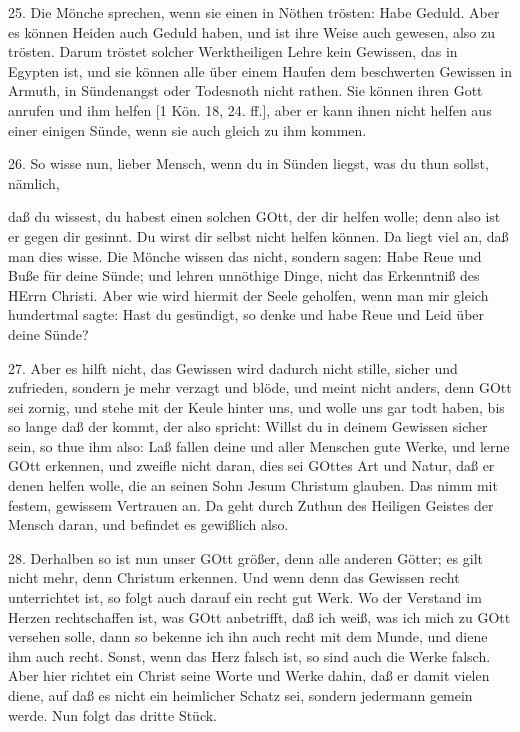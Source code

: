 25. Die Mönche sprechen, wenn sie einen in Nöthen trösten: Habe Geduld. Aber es können Heiden auch Geduld haben, und ist ihre Weise auch gewesen, also zu trösten. Darum tröstet solcher Werktheiligen Lehre kein Gewissen, das in Egypten ist, und sie können alle über einem Haufen dem beschwerten Gewissen in Armuth, in Sündenangst oder Todesnoth nicht rathen. Sie können ihren Gott anrufen und ihm helfen [1 Kön. 18, 24. ff.], aber er kann ihnen nicht helfen aus einer einigen Sünde, wenn sie auch gleich zu ihm kommen.

26. So wisse nun, lieber Mensch, wenn du in Sünden liegst, was du thun sollst, nämlich,

daß du wissest, du habest einen solchen GOtt, der dir helfen wolle; denn also ist er gegen dir gesinnt. Du wirst dir selbst nicht helfen können. Da liegt viel an, daß man dies wisse. Die Mönche wissen das nicht, sondern sagen: Habe Reue und Buße für deine Sünde; und lehren unnöthige Dinge, nicht das Erkenntniß des HErrn Christi. Aber wie wird hiermit der Seele geholfen, wenn man mir gleich hundertmal sagte: Hast du gesündigt, so denke und habe Reue und Leid über deine Sünde?

27. Aber es hilft nicht, das Gewissen wird dadurch nicht stille, sicher und zufrieden, sondern je mehr verzagt und blöde, und meint nicht anders, denn GOtt sei zornig, und stehe mit der Keule hinter uns, und wolle uns gar todt haben, bis so lange daß der kommt, der also spricht: Willst du in deinem Gewissen sicher sein, so thue ihm also: Laß fallen deine und aller Menschen gute Werke, und lerne GOtt erkennen, und zweifle nicht daran, dies sei GOttes Art und Natur, daß er denen helfen wolle, die an seinen Sohn Jesum Christum glauben. Das nimm mit festem, gewissem Vertrauen an. Da geht durch Zuthun des Heiligen Geistes der Mensch daran, und befindet es gewißlich also.

28. Derhalben so ist nun unser GOtt größer, denn alle anderen Götter; es gilt nicht mehr, denn Christum erkennen. Und wenn denn das Gewissen recht unterrichtet ist, so folgt auch darauf ein recht gut Werk. Wo der Verstand im Herzen rechtschaffen ist, was GOtt anbetrifft, daß ich weiß, was ich mich zu GOtt versehen solle, dann so bekenne ich ihn auch recht mit dem Munde, und diene ihm auch recht. Sonst, wenn das Herz falsch ist, so sind auch die Werke falsch. Aber hier richtet ein Christ seine Worte und Werke dahin, daß er damit vielen diene, auf daß es nicht ein heimlicher Schatz sei, sondern jedermann gemein werde. Nun folgt das dritte Stück.

